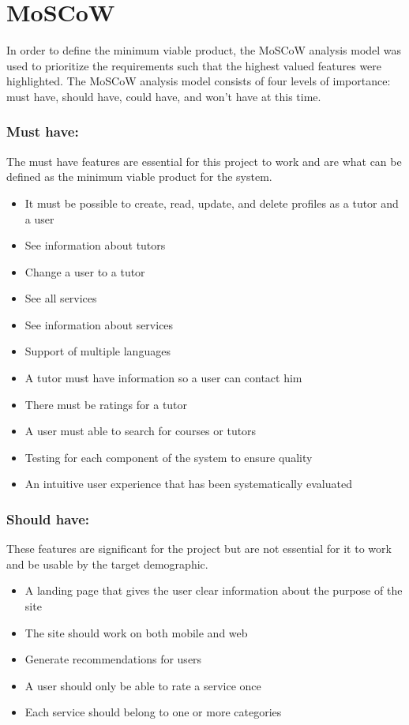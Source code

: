 \section{MoSCoW}\label{sec:moscow}
In order to define the minimum viable product, the MoSCoW analysis model was used to prioritize the requirements such that the highest valued features were highlighted.
The MoSCoW analysis model consists of four levels of importance: must have, should have, could have, and won't have at this time.

\subsubsection{Must have:}
The must have features are essential for this project to work and are what can be defined as the minimum viable product for the system.

\begin{itemize}
    \item It must be possible to create, read, update, and delete profiles as a tutor and a user
    \item See information about tutors
    \item Change a user to a tutor
    \item See all services
    \item See information about services
    \item Support of multiple languages
    \item A tutor must have information so a user can contact him
    \item There must be ratings for a tutor
    \item A user must able to search for courses or tutors
    \item Testing for each component of the system to ensure quality
    \item An intuitive user experience that has been systematically evaluated
\end{itemize}

\subsubsection{Should have:}
These features are significant for the project but are not essential for it to work and be usable by the target demographic.

\begin{itemize}
    \item A landing page that gives the user clear information about the purpose of the site
    \item The site should work on both mobile and web
    \item Generate recommendations for users
    \item A user should only be able to rate a service once
    \item Each service should belong to one or more categories
\end{itemize}

